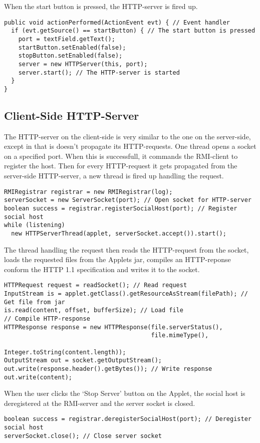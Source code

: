 \documentclass[a4paper, 10pt]{article}
\begin{document}
When the start button is pressed, the HTTP-server is fired up.
\begin{lstlisting}
public void actionPerformed(ActionEvent evt) { // Event handler
  if (evt.getSource() == startButton) { // The start button is pressed
    port = textField.getText();
    startButton.setEnabled(false);
    stopButton.setEnabled(false);
    server = new HTTPServer(this, port);
    server.start(); // The HTTP-server is started
  }
}
\end{lstlisting}

\subsection{Client-Side HTTP-Server}
The HTTP-server on the client-side is very similar to the one on the server-side, except in that is doesn't propagate its HTTP-requests. One thread opens a socket on a specified port. When this is successfull, it commands the RMI-client to register the host. Then for every HTTP-request it gets propagated from the server-side HTTP-server, a new thread is fired up handling the request.
\begin{lstlisting}
RMIRegistrar registrar = new RMIRegistrar(log);
serverSocket = new ServerSocket(port); // Open socket for HTTP-server
boolean success = registrar.registerSocialHost(port); // Register social host
while (listening)
  new HTTPServerThread(applet, serverSocket.accept()).start();
\end{lstlisting}
The thread handling the request then reads the HTTP-request from the socket, loads the requested files from the Applets jar, compiles an HTTP-reponse conform the HTTP 1.1 specification and writes it to the socket.
\begin{lstlisting}
HTTPRequest request = readSocket(); // Read request
InputStream is = applet.getClass().getResourceAsStream(filePath); // Get file from jar
is.read(content, offset, bufferSize); // Load file
// Compile HTTP-response
HTTPResponse response = new HTTPResponse(file.serverStatus(), 
                                         file.mimeType(), 
                                         Integer.toString(content.length));
OutputStream out = socket.getOutputStream();
out.write(response.header().getBytes()); // Write response
out.write(content);
\end{lstlisting}
When the user clicks the `Stop Server' button on the Applet, the social host is deregistered at the RMI-server and the server socket is closed.
\begin{lstlisting}
boolean success = registrar.deregisterSocialHost(port); // Deregister social host
serverSocket.close(); // Close server socket
\end{lstlisting}
\end{document}
